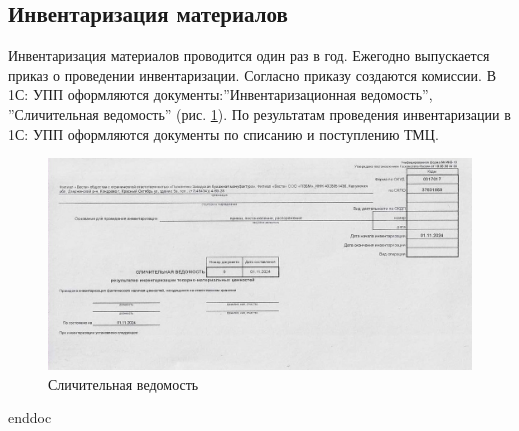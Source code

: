 %
\subsection{Инвентаризация материалов}

 Инвентаризация материалов проводится один раз в год. Ежегодно выпускается приказ о проведении инвентаризации.
Согласно приказу создаются комиссии. В 1С: УПП оформляются документы:''Инвентаризационная ведомость'', ''Сличительная ведомость'' (рис. \ref{pic:Слич ведомость}). По результатам проведения инвентаризации в 1С: УПП оформляются документы по списанию и поступлению ТМЦ.  






\begin{figure}
\begin{center}
 \includegraphics[height=0.33\textheight, keepaspectratio]{Pics/Слич ведомость.jpg}
\end{center}
 \caption{Сличительная ведомость}
 \label{pic:Слич ведомость}
\end{figure}

 \clearpage
 {enddoc}